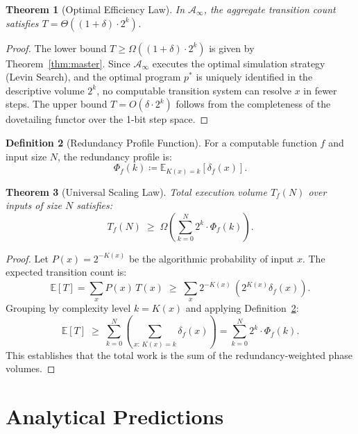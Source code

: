 \documentclass[12pt,a4paper]{article}
\theoremstyle{plain}
\newtheorem{theorem}{Theorem}[section]
\theoremstyle{definition}
\newtheorem{definition}[theorem]{Definition}
\begin{document}
\begin{theorem}[Optimal Efficiency Law] \label{thm:efficiency}
In $\mathcal{A}_\infty$, the aggregate transition count satisfies $T = \Theta((1+\delta) \cdot 2^{k})$.
\end{theorem}
\begin{proof}
The lower bound $T \ge \Omega((1+\delta) \cdot 2^{k})$ is given by Theorem~\ref{thm:master}. Since 
$\mathcal{A}_\infty$ executes the optimal simulation strategy (Levin Search), and the 
optimal program $p^*$ is uniquely identified in the descriptive volume $2^k$, no computable 
transition system can resolve $x$ in fewer steps. The upper bound $T = O(\delta \cdot 2^k)$ 
follows from the completeness of the dovetailing functor over the 1-bit step space.
\end{proof}

\begin{definition}[Redundancy Profile Function] \label{def:profile}
For a computable function $f$ and input size $N$, the redundancy profile is:
\begin{equation}
    \Phi_f(k) \coloneqq \mathbb{E}_{K(x)=k}\!\left[\delta_f(x)\right].
\end{equation}
\end{definition}

\begin{theorem}[Universal Scaling Law] \label{thm:integral}
Total execution volume $T_f(N)$ over inputs of size $N$ satisfies:
\begin{equation}
    T_f(N) \;\ge\; \Omega\!\left(\sum_{k=0}^N 2^k \cdot \Phi_f(k)\right).
\end{equation}
\end{theorem}
\begin{proof}
Let $P(x) = 2^{-K(x)}$ be the algorithmic probability of input $x$. The expected transition 
count is:
\begin{equation}
    \mathbb{E}[T] = \sum_x P(x)\, T(x) \;\ge\; \sum_x 2^{-K(x)}\, (2^{K(x)} \delta_f(x)).
\end{equation}
Grouping by complexity level $k = K(x)$ and applying Definition~\ref{def:profile}:
\begin{equation}
    \mathbb{E}[T] \;\ge\; \sum_{k=0}^N \left(\sum_{x:\,K(x)=k} \delta_f(x)\right) = \sum_{k=0}^N 2^k \cdot \Phi_f(k).
\end{equation}
This establishes that the total work is the sum of the redundancy-weighted phase volumes.
\end{proof}

\section{Analytical Predictions} \label{sec:predictions}
\end{document}
